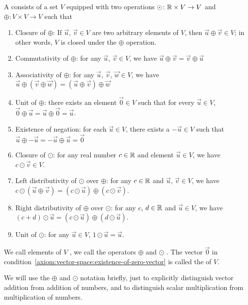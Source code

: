 \begin{definition}
A  consists of a set $V$ equipped with two
operations $\odot\colon\mathbb{R}\times V\to V$ and $\oplus\colon V\times V\to V$
such that
\begin{enumerate}[label=(\arabic*)]
\item Closure of $\oplus$: If $\vec{u}$, $\vec{v}\in V$ are two arbitrary elements of $V$,
  then $\vec{u}\oplus\vec{v}\in V$; in other words, $V$ is closed under
  the $\oplus$ operation.
\item Commutativity of $\oplus$: for any $\vec{u}$, $\vec{v}\in V$,
  we have $\vec{u}\oplus\vec{v}=\vec{v}\oplus\vec{u}$
\item Associativity of $\oplus$: for any $\vec{u}$, $\vec{v}$, $\vec{w}\in V$,
  we have $\vec{u}\oplus(\vec{v}\oplus\vec{w})=(\vec{u}\oplus\vec{v})\oplus\vec{w}$
\item\label{axiom:vector-space:existence-of-zero-vector} Unit of $\oplus$: there exists an element $\vec{0}\in V$ such that
  for every $\vec{u}\in V$, $\vec{0}\oplus\vec{u}=\vec{u}\oplus\vec{0}=\vec{u}$.
\item Existence of negation: for each $\vec{u}\in V$, there exists a
  $-\vec{u}\in V$ such that $\vec{u}\oplus-\vec{u}=-\vec{u}\oplus\vec{u}=\vec{0}$
\item Closure of $\odot$: for any real number $c\in\mathbb{R}$ and element
  $\vec{u}\in V$, we have $c\odot\vec{v}\in V$.
\item Left distributivity of $\odot$ over $\oplus$:
  for any $c\in\mathbb{R}$ and $\vec{u}$, $\vec{v}\in V$, we have
  $c\odot(\vec{u}\oplus\vec{v}) = (c\odot\vec{u})\oplus(c\odot\vec{v})$.
\item Right distributivity of $\oplus$ over $\odot$:
  for any $c$, $d\in\mathbb{R}$ and $\vec{u}\in V$, we have
  $(c+d)\odot\vec{u} = (c\odot\vec{u})\oplus(d\odot\vec{u})$.
\item Unit of $\odot$: for any $\vec{u}\in V$, $1\odot\vec{u}=\vec{u}$.
\end{enumerate}
We call elements of $V$ , we call the operators $\oplus$
 and $\odot$ .
The vector $\vec{0}$ in condition~\ref{axiom:vector-space:existence-of-zero-vector}
is called the  of $V$.
\end{definition}

\begin{remark}
We will use the $\oplus$ and $\odot$ notation briefly, just to
explicitly distinguish vector addition from addition of numbers, and to
distinguish scalar multiplication from multiplication of numbers.
\end{remark}

